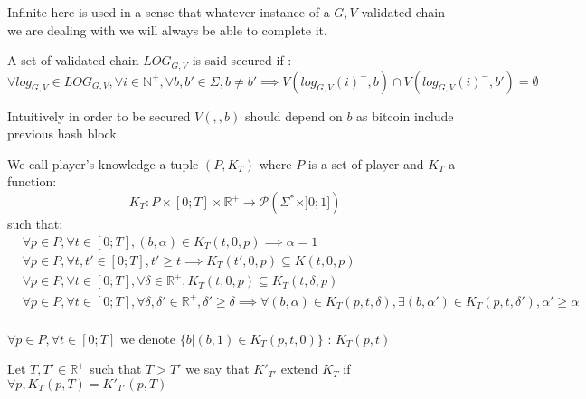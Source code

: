 \begin{myrem}
	Infinite here is used in a sense that whatever instance of a $G,V$ validated-chain we are dealing with we will always be able to complete it.
\end{myrem}

\begin{mydef}
	A set of validated chain $LOG_{G,V}$ is said secured if :
	$$\forall log_{G,V} \in LOG_{G,V}, \forall i \in \mathbb{N}^+ , \forall b,b' \in \Sigma, b\neq b' \implies V(log_{G,V}(i)^-,b)\cap V(log_{G,V}(i)^-,b') = \emptyset$$
\end{mydef}

\begin{myrem}
	Intuitively in order to be secured $V(,,b)$ should depend on $b$ as bitcoin include previous hash block. 
\end{myrem}

\begin{mydef}
	We call player's knowledge a tuple $(P,K_{T})$ where $P$ is a set of player and $K_{T}$ a function:
	$$K_{T} : P\times [0;T] \times \mathbb{R}^+ \rightarrow \mathscr{P}(\Sigma^* \times ]0;1])$$
	such that: 
	\begin{align*}
	&\forall p \in P,\forall t\in [ 0;T ], (b,\alpha) \in K_{T}(t,0,p) \implies \alpha = 1 \\
	&\forall p \in P,\forall t,t'\in [ 0;T ], t' \geq t \implies K_{T}(t',0,p) \subseteq K(t,0,p)  \\
	&\forall p \in P,\forall t\in [ 0;T ], \forall \delta \in \mathbb{R}^+, K_{T}(t,0,p) \subseteq K_{T}(t,\delta,p) \\
	&\forall p \in P,\forall t\in [ 0;T ], \forall \delta,\delta' \in \mathbb{R}^+, \delta' \geq \delta \implies \forall (b,\alpha) \in K_{T}(p,t,\delta), \exists (b,\alpha') \in K_{T}(p,t,\delta'), \alpha'\geq \alpha\\
	\end{align*}
\end{mydef}

\begin{mynota}
	$\forall p \in P, \forall t\in [0;T]$ we denote $\{b | (b,1) \in K_{T}(p,t,0)\}$ : $K_{T}(p,t)$
\end{mynota}

\begin{mydef}
	Let $T,T' \in \mathbb{R}^+$ such that $T>T'$ we say that $K'_{T'}$ extend $K_{T}$ if $\forall p, K_{T}(p,T) = K'_{T'}(p,T)$
\end{mydef}


